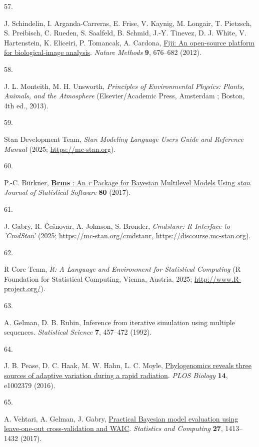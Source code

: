 \documentclass[
  letterpaper,
  DIV=11,
  numbers=noendperiod]{scrartcl}
\newlength{\cslhangindent}
\newlength{\csllabelwidth}
\newenvironment{CSLReferences}[2] %
 {\begin{list}{}{%
  \setlength{\itemindent}{0pt}
  \setlength{\leftmargin}{0pt}
  \setlength{\parsep}{0pt}
  \ifodd #1
   \setlength{\leftmargin}{\cslhangindent}
   \setlength{\itemindent}{-1\cslhangindent}
  \fi
  \setlength{\itemsep}{#2\baselineskip}}}
 {\end{list}}
\newcommand{\CSLLeftMargin}[1]{\parbox[t]{\csllabelwidth}{\strut#1\strut}}
\newcommand{\CSLRightInline}[1]{\parbox[t]{\linewidth - \csllabelwidth}{\strut#1\strut}}
\begin{document}
\begin{CSLReferences}{0}{1}
\CSLLeftMargin{57. }%
\CSLRightInline{J. Schindelin, I. Arganda-Carreras, E. Frise, V. Kaynig,
M. Longair, T. Pietzsch, S. Preibisch, C. Rueden, S. Saalfeld, B.
Schmid, J.-Y. Tinevez, D. J. White, V. Hartenstein, K. Eliceiri, P.
Tomancak, A. Cardona, \href{https://doi.org/10.1038/nmeth.2019}{Fiji: An
open-source platform for biological-image analysis}. \emph{Nature
Methods} \textbf{9}, 676--682 (2012).}

\CSLLeftMargin{58. }%
\CSLRightInline{J. L. Monteith, M. H. Unsworth, \emph{Principles of
Environmental Physics: Plants, Animals, and the Atmosphere}
(Elsevier/Academic Press, Amsterdam ; Boston, 4th ed., 2013).}

\CSLLeftMargin{59. }%
\CSLRightInline{Stan Development Team, \emph{Stan {Modeling} {Language}
{Users} {Guide} and {Reference} {Manual}} (2025;
\url{https://mc-stan.org}).}

\CSLLeftMargin{60. }%
\CSLRightInline{P.-C. Bürkner,
\href{https://doi.org/10.18637/jss.v080.i01}{\textbf{Brms} : {An}
\emph{r} {Package} for {Bayesian} {Multilevel} {Models} {Using}
\emph{stan}}. \emph{Journal of Statistical Software} \textbf{80}
(2017).}

\CSLLeftMargin{61. }%
\CSLRightInline{J. Gabry, R. Češnovar, A. Johnson, S. Bronder,
\emph{Cmdstanr: {R} {Interface} to '{CmdStan}'} (2025;
\href{https://mc-stan.org/cmdstanr,\%20https://discourse.mc-stan.org}{https://mc-stan.org/cmdstanr,
https://discourse.mc-stan.org}).}

\CSLLeftMargin{62. }%
\CSLRightInline{R Core Team, \emph{R: {A} {Language} and {Environment}
for {Statistical} {Computing}} (R Foundation for Statistical Computing,
Vienna, Austria, 2025; \url{http://www.R-project.org/}).}

\CSLLeftMargin{63. }%
\CSLRightInline{A. Gelman, D. B. Rubin, Inference from iterative
simulation using multiple sequences. \emph{Statistical Science}
\textbf{7}, 457--472 (1992).}

\CSLLeftMargin{64. }%
\CSLRightInline{J. B. Pease, D. C. Haak, M. W. Hahn, L. C. Moyle,
\href{https://doi.org/10.1371/journal.pbio.1002379}{Phylogenomics
reveals three sources of adaptive variation during a rapid radiation}.
\emph{PLOS Biology} \textbf{14}, e1002379 (2016).}

\CSLLeftMargin{65. }%
\CSLRightInline{A. Vehtari, A. Gelman, J. Gabry,
\href{https://doi.org/10.1007/s11222-016-9696-4}{Practical {Bayesian}
model evaluation using leave-one-out cross-validation and {WAIC}}.
\emph{Statistics and Computing} \textbf{27}, 1413--1432 (2017).}

\end{CSLReferences}
\end{document}
